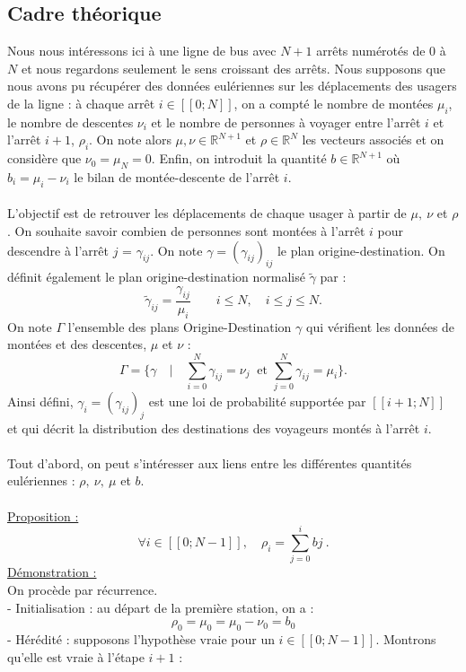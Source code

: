 \documentclass[12pt]{article}
\newcommand{\R}{\mathbb{R}}
\newcommand{\dcrochetg}{[\![}
\newcommand{\dcrochetd}{]\!]}
\newcommand{\prop}{\underline{Proposition :} }
\newcommand{\demo}{\underline{Démonstration :} }
\begin{document}
\subsection{Cadre théorique}
Nous nous intéressons ici à une ligne de bus avec $N+1$ arrêts numérotés de 0 à $N$ et nous regardons seulement le sens croissant des arrêts. Nous supposons que nous avons pu récupérer des données eulériennes sur les déplacements des usagers de la ligne : à chaque arrêt $i \in \dcrochetg 0;N\dcrochetd$, on a compté le nombre de montées $\mu_i$, le nombre de descentes $\nu_i$ et le nombre de personnes à voyager entre l'arrêt $i$ et l'arrêt $i+1$, $\rho_i$. On note alors $\mu, \nu \in \R^{N+1}$ et $\rho \in \R^N$ les vecteurs associés et on considère que $\nu_0 = \mu_N = 0$. Enfin, on introduit la quantité $b \in \R^{N+1}$ où $b_i = \mu_i - \nu_i$ le bilan de montée-descente de l'arrêt $i$.\\
\\
L'objectif est de retrouver les déplacements de chaque usager à partir de $\mu,\: \nu$ et $\rho$. On souhaite savoir combien de personnes sont montées à l'arrêt $i$ pour descendre à l'arrêt $j$ = $\gamma_{ij}$. On note $\gamma = (\gamma_{ij})_{ij}$ le plan origine-destination. On définit également le plan origine-destination normalisé $\tilde{\gamma}$ par : 
\[\tilde{\gamma}_{ij} = \frac{\gamma_{ij}}{\mu_i} \qquad i \leq N,\quad i\leq j\leq N.\] 
On note $\Gamma$ l'ensemble des plans Origine-Destination $\gamma$ qui vérifient les données de montées et des descentes, $\mu$ et $\nu$ :
\[
\Gamma = \{\gamma \quad | \quad \sum^{N}_{i=0} \gamma_{ij} = \nu_j\:\text{ et }  \sum^{N}_{j=0} \gamma_{ij} = \mu_i\}.
\]
Ainsi défini, $\gamma_i = (\gamma_{ij})_j$ est une loi de probabilité supportée par $\dcrochetg i+1;N\dcrochetd$ et qui décrit la distribution des destinations des voyageurs montés à l'arrêt $i$.\\
\\
Tout d'abord, on peut s'intéresser aux liens entre les différentes quantités eulériennes : $\rho, \:\nu,\:\mu$ et $b$.\\
\\
\prop \[\forall i \in \dcrochetg0;N-1\dcrochetd, \quad \rho_i = \sum^i_{j=0} bj \:.\]
\demo\\
On procède par récurrence.\\
- Initialisation : au départ de la première station, on a :
\[ \rho_0 = \mu_0 = \mu_0 - \nu_0 = b_0
\]
- Hérédité : supposons l'hypothèse vraie pour un $i \in \dcrochetg0;N-1\dcrochetd$. Montrons qu'elle est vraie à l'étape $i+1$ :\\
\end{document}
